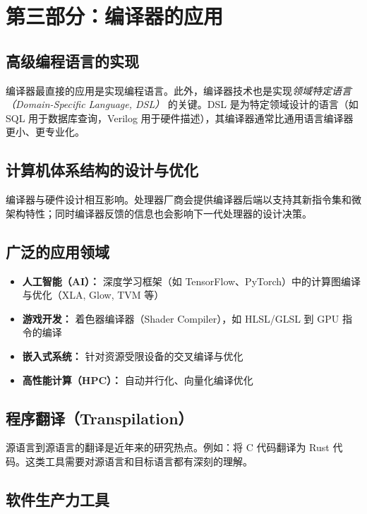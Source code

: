 \documentclass[12pt,a4paper]{ctexart}
\begin{document}
\newpage

\section{第三部分：编译器的应用}

\subsection{高级编程语言的实现}

编译器最直接的应用是实现编程语言。此外，编译器技术也是实现\emph{领域特定语言（Domain-Specific Language, DSL）} 的关键。DSL 是为特定领域设计的语言（如 SQL 用于数据库查询，Verilog 用于硬件描述），其编译器通常比通用语言编译器更小、更专业化。

\subsection{计算机体系结构的设计与优化}

编译器与硬件设计相互影响。处理器厂商会提供编译器后端以支持其新指令集和微架构特性；同时编译器反馈的信息也会影响下一代处理器的设计决策。

\subsection{广泛的应用领域}

\begin{itemize}[itemsep=0.2em]
  \item \textbf{人工智能（AI）：} 深度学习框架（如 TensorFlow、PyTorch）中的计算图编译与优化（XLA, Glow, TVM 等）
  \item \textbf{游戏开发：} 着色器编译器（Shader Compiler），如 HLSL/GLSL 到 GPU 指令的编译
  \item \textbf{嵌入式系统：} 针对资源受限设备的交叉编译与优化
  \item \textbf{高性能计算（HPC）：} 自动并行化、向量化编译优化
\end{itemize}

\subsection{程序翻译（Transpilation）}

源语言到源语言的翻译是近年来的研究热点。例如：将 C 代码翻译为 Rust 代码。这类工具需要对源语言和目标语言都有深刻的理解。

\subsection{软件生产力工具}
\end{document}

